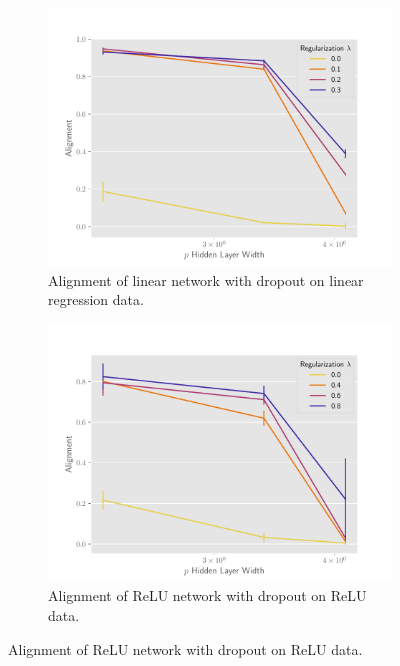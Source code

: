 \begin{figure}[h]
\centering

\begin{subfigure}[b]{.49\textwidth}
  \centering
  \includegraphics[width=\linewidth]{figures/align_lr_non_autograd_dropout_v2.pdf}
  \caption{Alignment of linear network with dropout on linear regression data.}
  \label{fig:align_lr_non_autograd_dropout}
\end{subfigure}\hfill
\begin{subfigure}[b]{.49\textwidth}
  \centering
  \includegraphics[width=\linewidth]{figures/align_nn_relu_autograd_dropout_v2.pdf}
  \caption{Alignment of ReLU network with dropout on ReLU data.}
  \label{fig:align_nn_relu_autograd_dropout}
\end{subfigure}


\end{figure}
